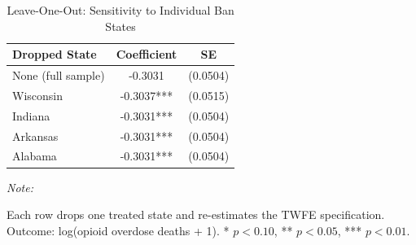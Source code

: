 \begin{table}[!h]
\centering
\caption{\label{tab:loo}Leave-One-Out: Sensitivity to Individual Ban States}
\centering
\begin{threeparttable}
\begin{tabular}[t]{lcc}
\toprule
Dropped State & Coefficient & SE\\
\midrule
None (full sample) & -0.3031 & (0.0504)\\
Wisconsin & -0.3037*** & (0.0515)\\
Indiana & -0.3031*** & (0.0504)\\
Arkansas & -0.3031*** & (0.0504)\\
Alabama & -0.3031*** & (0.0504)\\
\bottomrule
\end{tabular}
\begin{tablenotes}
\item \textit{Note: } 
\item Each row drops one treated state and re-estimates the TWFE specification. Outcome: log(opioid overdose deaths + 1). * $p<0.10$, ** $p<0.05$, *** $p<0.01$.
\end{tablenotes}
\end{threeparttable}
\end{table}
